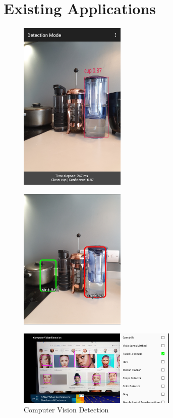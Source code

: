 \chapter{Existing Applications}\label{intro}

    \begin{figure}[!ht]
        \centering
        \begin{minipage}{.5\textwidth}
            \centering
            \includegraphics[width=2in]{images/chapter2/object-detector.jpg}
            \label{appendix:obj-detector}
        \end{minipage}%
        \begin{minipage}{.5\textwidth}
            \centering
            \includegraphics[width=2in]{images/chapter2/ml-detection-tf.jpg}
            \label{appendix:ts-obj-detection}
        \end{minipage}
    \end{figure}

    \begin{figure}[!ht]
        \centering
        \includegraphics[width=3in]{images/chapter2/cv-detection.jpg}
        \caption{Computer Vision Detection}
        \label{appendix:cv-detection}
    \end{figure}